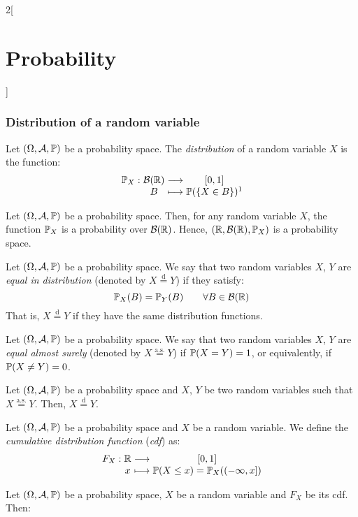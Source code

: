 \documentclass[../../../main_math.tex]{subfiles}
\begin{document}
\begin{multicols}{2}[\section{Probability}]
  \subsubsection{Distribution of a random variable}
  \begin{definition}
    Let $(\Omega,\mathcal{A},\mathbb{P})$ be a probability space. The \emph{distribution} of a random variable $X$ is the function:
    $$
      \function{\Prob_X}{\mathcal{B}(\RR)}{[0,1]}{B}{\Prob(\{X\in B\})\footnotemark}
    $$
  \end{definition}
  \begin{proposition}
    Let $(\Omega,\mathcal{A},\mathbb{P})$ be a probability space. Then, for any random variable $X$, the function $\mathbb{P}_X$ is a probability over $\mathcal{B}(\mathbb{R})$. Hence, $(\mathbb{R},\mathcal{B}(\mathbb{R}),\mathbb{P}_X)$ is a probability space.
  \end{proposition}
  \begin{definition}
    Let $(\Omega,\mathcal{A},\mathbb{P})$ be a probability space. We say that two random variables $X$, $Y$ are \emph{equal in distribution} (denoted by $X\overset{\text{d}}{=}Y$) if they satisfy: $$\mathbb{P}_X(B)=\mathbb{P}_Y(B)\qquad\forall B\in\mathcal{B}(\mathbb{R})$$ That is, $X\overset{\text{d}}{=}Y$ if they have the same distribution functions.
  \end{definition}
  \begin{definition}
    Let $(\Omega,\mathcal{A},\mathbb{P})$ be a probability space. We say that two random variables $X$, $Y$ are \emph{equal almost surely} (denoted by $X\overset{\text{a.s.}}{=}Y$) if $\mathbb{P}(X=Y)=1$, or equivalently, if $\mathbb{P}(X\ne Y)=0$.
  \end{definition}
  \begin{proposition}
    Let $(\Omega,\mathcal{A},\mathbb{P})$ be a probability space and $X$, $Y$ be two random variables such that $X\overset{\text{a.s.}}{=}Y$. Then, $X\overset{\text{d}}{=}Y$.
  \end{proposition}
  \begin{definition}
    Let $(\Omega,\mathcal{A},\mathbb{P})$ be a probability space and $X$ be a random variable. We define the \emph{cumulative distribution function} (\emph{cdf}) as:
    $$
      \function{F_X}{\RR}{[0,1]}{x}{\Prob(X\leq x)=\Prob_X((-\infty,x])}
    $$
  \end{definition}
  \begin{theorem}
    Let $(\Omega,\mathcal{A},\mathbb{P})$ be a probability space, $X$ be a random variable and $F_X$ be its cdf. Then:

\end{theorem}
\end{multicols}
\end{document}
